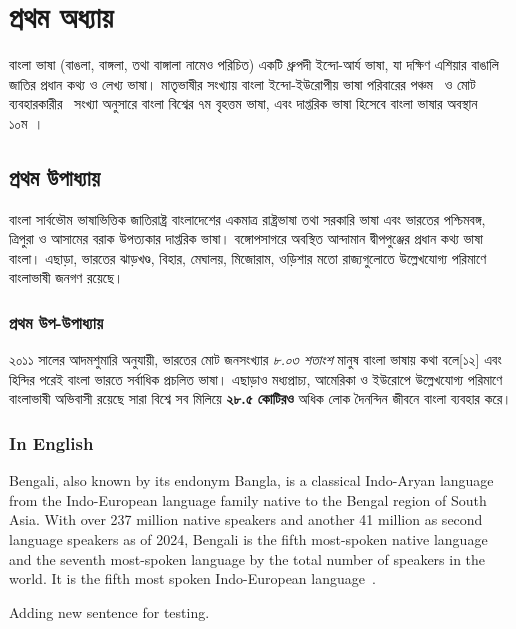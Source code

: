\section{প্রথম অধ্যায়}
বাংলা ভাষা (বাঙলা, বাঙ্গলা, তথা বাঙ্গালা নামেও পরিচিত) একটি ধ্রুপদী ইন্দো-আর্য ভাষা, যা দক্ষিণ এশিয়ার বাঙালি জাতির প্রধান কথ্য ও লেখ্য ভাষা। মাতৃভাষীর সংখ্যায় বাংলা ইন্দো-ইউরোপীয় ভাষা পরিবারের পঞ্চম~\cite{reference1} ও মোট ব্যবহারকারীর~\cite{reference2} সংখ্যা অনুসারে বাংলা বিশ্বের ৭ম বৃহত্তম ভাষা, এবং দাপ্তরিক ভাষা হিসেবে বাংলা ভাষার অবস্থান ১০ম~\cite{ক০২}।

\subsection{প্রথম উপাধ্যায়}
বাংলা সার্বভৌম ভাষাভিত্তিক জাতিরাষ্ট্র বাংলাদেশের একমাত্র রাষ্ট্রভাষা তথা সরকারি ভাষা এবং ভারতের পশ্চিমবঙ্গ, ত্রিপুরা ও আসামের বরাক উপত্যকার দাপ্তরিক ভাষা। বঙ্গোপসাগরে অবস্থিত আন্দামান দ্বীপপুঞ্জের প্রধান কথ্য ভাষা বাংলা। এছাড়া, ভারতের ঝাড়খণ্ড, বিহার, মেঘালয়, মিজোরাম, ওড়িশার মতো রাজ্যগুলোতে উল্লেখযোগ্য পরিমাণে বাংলাভাষী জনগণ রয়েছে। 

\subsubsection{প্রথম উপ-উপাধ্যায়}
২০১১ সালের আদমশুমারি অনুযায়ী, ভারতের মোট জনসংখ্যার \textit{৮.০৩ শতাংশ} মানুষ বাংলা ভাষায় কথা বলে[১২] এবং হিন্দির পরেই বাংলা ভারতে সর্বাধিক প্রচলিত ভাষা। এছাড়াও মধ্যপ্রাচ্য, আমেরিকা ও ইউরোপে উল্লেখযোগ্য পরিমাণে বাংলাভাষী অভিবাসী রয়েছে সারা বিশ্বে সব মিলিয়ে \textbf{২৮.৫ কোটিরও} অধিক লোক দৈনন্দিন জীবনে বাংলা ব্যবহার করে।

\subsubsection{\englishfont In English}
{\englishfont 
Bengali, also known by its endonym Bangla, is a classical Indo-Aryan language from the Indo-European language family native to the Bengal region of South Asia. With over 237 million native speakers and another 41 million as second language speakers as of 2024, Bengali is the fifth most-spoken native language and the seventh most-spoken language by the total number of speakers in the world. It is the fifth most spoken Indo-European language~\cite{reference2}.

Adding new sentence for testing. 
}
